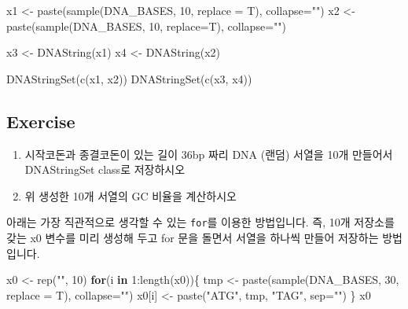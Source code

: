 \documentclass[
]{book}
\newenvironment{Shaded}{\begin{snugshade}}{\end{snugshade}}
\newcommand{\AttributeTok}[1]{\textcolor[rgb]{0.77,0.63,0.00}{#1}}
\newcommand{\ControlFlowTok}[1]{\textcolor[rgb]{0.13,0.29,0.53}{\textbf{#1}}}
\newcommand{\DecValTok}[1]{\textcolor[rgb]{0.00,0.00,0.81}{#1}}
\newcommand{\FunctionTok}[1]{\textcolor[rgb]{0.00,0.00,0.00}{#1}}
\newcommand{\NormalTok}[1]{#1}
\newcommand{\OtherTok}[1]{\textcolor[rgb]{0.56,0.35,0.01}{#1}}
\newcommand{\SpecialCharTok}[1]{\textcolor[rgb]{0.00,0.00,0.00}{#1}}
\newcommand{\StringTok}[1]{\textcolor[rgb]{0.31,0.60,0.02}{#1}}
\begin{document}
\begin{Shaded}
\begin{Highlighting}[]
\NormalTok{x1 }\OtherTok{\textless{}{-}} \FunctionTok{paste}\NormalTok{(}\FunctionTok{sample}\NormalTok{(DNA\_BASES, }\DecValTok{10}\NormalTok{, }\AttributeTok{replace =}\NormalTok{ T), }\AttributeTok{collapse=}\StringTok{""}\NormalTok{)}
\NormalTok{x2 }\OtherTok{\textless{}{-}} \FunctionTok{paste}\NormalTok{(}\FunctionTok{sample}\NormalTok{(DNA\_BASES, }\DecValTok{10}\NormalTok{, }\AttributeTok{replace=}\NormalTok{T), }\AttributeTok{collapse=}\StringTok{""}\NormalTok{)}

\NormalTok{x3 }\OtherTok{\textless{}{-}} \FunctionTok{DNAString}\NormalTok{(x1)}
\NormalTok{x4 }\OtherTok{\textless{}{-}} \FunctionTok{DNAString}\NormalTok{(x2)}

\FunctionTok{DNAStringSet}\NormalTok{(}\FunctionTok{c}\NormalTok{(x1, x2))}
\FunctionTok{DNAStringSet}\NormalTok{(}\FunctionTok{c}\NormalTok{(x3, x4))}
\end{Highlighting}
\end{Shaded}

\hypertarget{exercise-5}{%
\subsection{Exercise}\label{exercise-5}}

\begin{enumerate}
\def\labelenumi{\arabic{enumi}.}
\item
  시작코돈과 종결코돈이 있는 길이 36bp 짜리 DNA (랜덤) 서열을 10개 만들어서 DNAStringSet class로 저장하시오
\item
  위 생성한 10개 서열의 GC 비율을 계산하시오
\end{enumerate}

아래는 가장 직관적으로 생각할 수 있는 \texttt{for}를 이용한 방법입니다. 즉, 10개 저장소를 갖는 x0 변수를 미리 생성해 두고 for 문을 돌면서 서열을 하나씩 만들어 저장하는 방법입니다.

\begin{Shaded}
\begin{Highlighting}[]
\NormalTok{x0 }\OtherTok{\textless{}{-}} \FunctionTok{rep}\NormalTok{(}\StringTok{""}\NormalTok{, }\DecValTok{10}\NormalTok{)}
\ControlFlowTok{for}\NormalTok{(i }\ControlFlowTok{in} \DecValTok{1}\SpecialCharTok{:}\FunctionTok{length}\NormalTok{(x0))\{}
\NormalTok{  tmp }\OtherTok{\textless{}{-}} \FunctionTok{paste}\NormalTok{(}\FunctionTok{sample}\NormalTok{(DNA\_BASES, }\DecValTok{30}\NormalTok{, }\AttributeTok{replace =}\NormalTok{ T), }\AttributeTok{collapse=}\StringTok{""}\NormalTok{)}
\NormalTok{  x0[i] }\OtherTok{\textless{}{-}} \FunctionTok{paste}\NormalTok{(}\StringTok{"ATG"}\NormalTok{, tmp, }\StringTok{"TAG"}\NormalTok{, }\AttributeTok{sep=}\StringTok{""}\NormalTok{)}
\NormalTok{\}}
\NormalTok{x0}
\end{Highlighting}
\end{Shaded}
\end{document}
